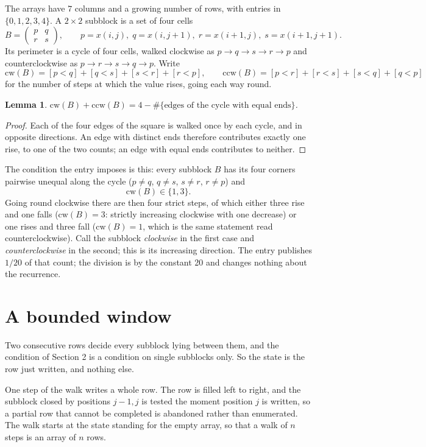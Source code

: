 \documentclass[11pt,a4paper]{article}
\theoremstyle{plain}
\newtheorem{lemma}[theorem]{Lemma}
\theoremstyle{definition}
\begin{document}
The arrays have $7$ columns and a growing number of rows, with entries in $\{0,1,2,3,4\}$. A
$2\times2$ subblock is a set of four cells
\[
B=\begin{pmatrix} p & q \\ r & s \end{pmatrix},
\qquad p=x(i,j),\; q=x(i,j+1),\; r=x(i+1,j),\; s=x(i+1,j+1).
\]
Its perimeter is a cycle of four cells, walked clockwise as $p\to q\to s\to r\to p$ and
counterclockwise as $p\to r\to s\to q\to p$. Write
\[
\mathrm{cw}(B)=[p<q]+[q<s]+[s<r]+[r<p],\qquad
\mathrm{ccw}(B)=[p<r]+[r<s]+[s<q]+[q<p]
\]
for the number of steps at which the value rises, going each way round.

\begin{lemma}\label{lem:sum}
$\mathrm{cw}(B)+\mathrm{ccw}(B)=4-\#\{\text{edges of the cycle with equal ends}\}$.
\end{lemma}

\begin{proof}
Each of the four edges of the square is walked once by each cycle, and in opposite directions.
An edge with distinct ends therefore contributes exactly one rise, to one of the two counts;
an edge with equal ends contributes to neither.
\end{proof}

The condition the entry imposes is this: every subblock $B$ has its four corners pairwise unequal along the cycle ($p\ne q$, $q\ne s$, $s\ne r$, $r\ne p$) and
\[
\mathrm{cw}(B)\in\{1,3\}.
\]
Going round clockwise there are then four strict steps, of which either three rise and one falls ($\mathrm{cw}(B)=3$: strictly increasing clockwise with one decrease) or one rises and three fall ($\mathrm{cw}(B)=1$, which is the same statement read counterclockwise). Call the subblock \emph{clockwise} in the first case and \emph{counterclockwise} in the second; this is its increasing direction. The entry publishes $1/20$ of that count; the division is by the constant 20 and changes nothing about the recurrence.

\section{A bounded window}

Two consecutive rows decide every subblock lying between them, and the condition of Section 2 is a condition on single subblocks only. So the state is the row just written, and nothing else.

One step of the walk writes a whole row. The row is filled left to right, and the subblock
closed by positions $j-1,j$ is tested the moment position $j$ is written, so a partial row that
cannot be completed is abandoned rather than enumerated. The walk starts at the state standing
for the empty array, so that a walk of $n$ steps is an array of $n$ rows.
\end{document}
